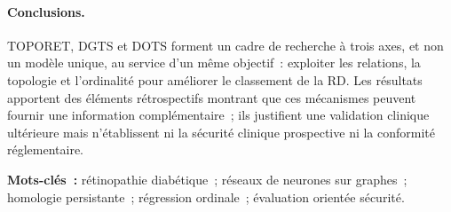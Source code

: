 \paragraph{Conclusions.}
TOPORET, DGTS et DOTS forment un cadre de recherche \`a trois axes, et non un mod\`ele
unique, au service d'un m\^eme objectif~: exploiter les relations, la topologie et
l'ordinalit\'e pour am\'eliorer le classement de la RD. Les r\'esultats apportent des
\'el\'ements r\'etrospectifs montrant que ces m\'ecanismes peuvent fournir une information
compl\'ementaire~; ils justifient une validation clinique ult\'erieure mais n'\'etablissent
ni la s\'ecurit\'e clinique prospective ni la conformit\'e r\'eglementaire.

\vspace{0.6em}
\noindent\textbf{Mots-cl\'es~:} r\'etinopathie diab\'etique~; r\'eseaux de neurones sur
graphes~; homologie persistante~; r\'egression ordinale~; \'evaluation orient\'ee s\'ecurit\'e.
\par\endgroup
